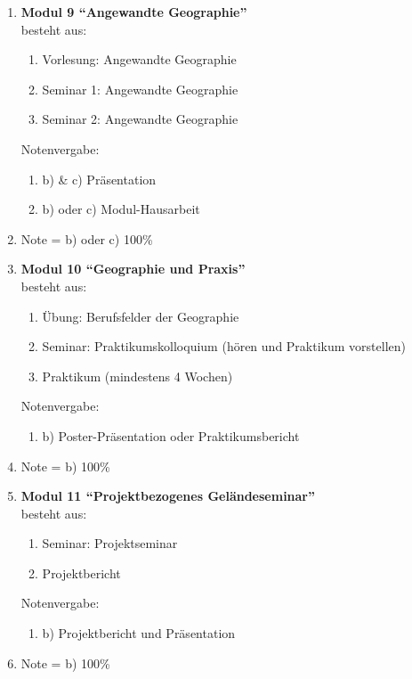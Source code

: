 \begin{enumerate}
 \item \textbf{Modul 9 ``Angewandte Geographie''}  \\ besteht aus:
  \begin{enumerate}
   \item Vorlesung: Angewandte Geographie
   \item Seminar 1: Angewandte Geographie
   \item Seminar 2: Angewandte Geographie
  \end{enumerate}
  Notenvergabe:
  \begin{enumerate}
   \item[] b) \& c) Präsentation
   \item[] b) oder c) Modul-Hausarbeit
  \end{enumerate}
  \item[] Note = b) oder c) 100\%

 \item \textbf{Modul 10 ``Geographie und Praxis''}  \\ besteht aus:
  \begin{enumerate}
   \item Übung: Berufsfelder der Geographie
   \item Seminar: Praktikumskolloquium (hören und Praktikum vorstellen)
   \item Praktikum (mindestens 4 Wochen)
  \end{enumerate}
  Notenvergabe:
  \begin{enumerate}
   \item[] b) Poster-Präsentation oder Praktikumsbericht
  \end{enumerate}
  \item[] Note = b) 100\%



 \item \textbf{Modul 11 ``Projektbezogenes Geländeseminar''}  \\ besteht aus:
  \begin{enumerate}
   \item Seminar: Projektseminar
   \item Projektbericht
  \end{enumerate}
  Notenvergabe:
  \begin{enumerate}
    \item[] b) Projektbericht und Präsentation
   \end{enumerate}
   \item[] Note = b) 100\%


\end{enumerate}
